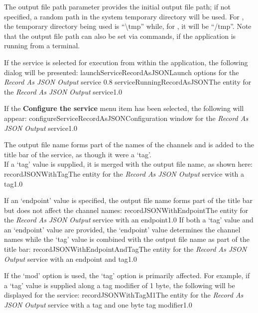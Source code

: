 The output file path parameter provides the initial output file path; if not specified, a
random path in the system temporary directory will be used.
For \win, the temporary directory being used is ``\textbackslash{}tmp'' while, for \osx{},
it will be ``/tmp''.
Note that the output file path can also be set via commands, if the application is
running from a terminal.\\

\insertStandardServiceCommands

If the service is selected for execution from within the \emph{\MMMU} application, the
following dialog will be presented:
%
{launchServiceRecordAsJSON}{Launch options for the \emph{Record As JSON Output} service}%
{0.8}
\condPage
{}%
{serviceRunningRecordAsJSON}{The \emph{\MMMU} entity for the \emph{Record As JSON Output}
service}{1.0}

If the \textbf{Configure the service} menu item has been selected, the following will
appear:
%
{configureServiceRecordAsJSON}{Configuration window for the \emph{Record As JSON Output}
service}{1.0}

The output file name forms part of the names of the channels and is added to the title bar
of the service, as though it were a `tag'.\\

If a `tag' value is supplied, it is merged with the output file name, as shown here:
%
{recordJSONWithTag}{The \emph{\MMMU} entity for the \emph{Record As JSON Output} service
with a tag}{1.0}

If an `endpoint' value is specified, the output file name forms part of the title bar but
does not affect the channel names:
%
{recordJSONWithEndpoint}{The \emph{\MMMU} entity for the \emph{Record As JSON Output}
service with an endpoint}{1.0}
\condPage{}
If both a `tag' value and an `endpoint' value are provided, the `endpoint' value
determines the channel names while the `tag' value is combined with the output file name
as part of the title bar:
%
{recordJSONWithEndpointAndTag}{The \emph{\MMMU} entity for the \emph{Record As JSON
Output} service with an endpoint and tag}{1.0}

If the `mod' option is used, the `tag' option is primarily affected.
For example, if a `tag' value is supplied along a tag modifier of 1 byte, the following
will be displayed for the service:
%
{recordJSONWithTagM1}{The \emph{\MMMU} entity for the \emph{Record As JSON Output} service
with a tag and one byte tag modifier}{1.0}


